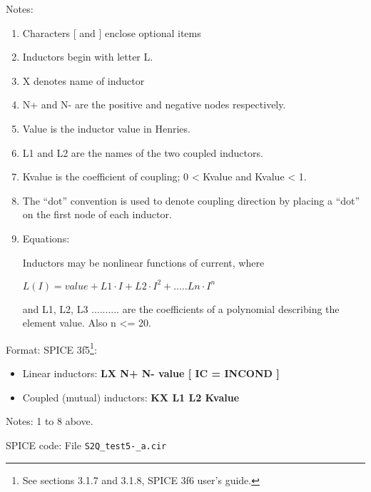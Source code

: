 Notes: 
\begin{enumerate}
 \item Characters [ and ] enclose optional items 
 \item Inductors begin with letter L.
 \item X denotes name of inductor
 \item N+ and N- are the positive and negative nodes respectively.
 \item Value is the inductor value in Henries.
 \item L1 and L2 are the names of the two coupled inductors.
 \item Kvalue is the coefficient of coupling; 0 < Kvalue and Kvalue < 1.
 \item The ``dot'' convention is used to denote coupling direction by placing a ``dot'' on the first node of each inductor.
 \item Equations:
\begin{flushleft}
Inductors may be nonlinear functions of current, where                                                                                     
\vspace{3mm}

$L(I)=value + L1 \cdot I + L2 \cdot I^{2}+ ..... Ln \cdot I^{n}$                                                                            
\linebreak 


and L1, L2, L3 .......... are the coefficients of a polynomial describing the element value.  Also n <= 20.
\end{flushleft}
\end{enumerate}

\begin{flushleft}
Format: SPICE 3f5\footnote{See sections 3.1.7 and 3.1.8, SPICE 3f6 user's guide.}:
\begin{itemize}
\item Linear inductors: \textbf{LX N+ N- value [ IC = INCOND ]}
\item Coupled (mutual) inductors: \textbf{KX L1 L2 Kvalue}
\end{itemize}

Notes: 1 to 8 above.
 \end{flushleft}

\begin{flushleft}

SPICE code: File \verb|S2Q_test5-_a.cir|

\end{flushleft}

